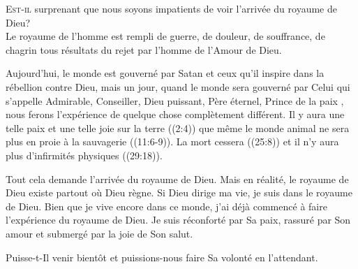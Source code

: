 

\lettrine{E}{st-il} surprenant que nous soyons impatients
 de voir l'arrivée du royaume de Dieu? \\[1ex]
Le royaume de l'homme est rempli de guerre, de douleur, de souffrance,
 de chagrin \ocadr tous résultats du rejet par l'homme de l'Amour de Dieu. 


Aujourd'hui, le monde est gouverné par Satan et ceux qu'il inspire
 dans la rébellion contre Dieu, mais un jour, quand le monde sera gouverné
 par Celui qui s'appelle \Og Admirable, Conseiller, Dieu puissant,
 Père éternel, Prince de la paix \Fg{}, 
 nous ferons l'expérience de quelque chose complètement différent.
 Il y aura une telle paix et une telle joie sur la terre ((2:4))
 que même le monde animal ne sera plus en proie à la sauvagerie
 ((11:6-9)).
 La mort cessera ((25:8))
 et il n'y aura plus d'infirmités physiques ((29:18)). 

Tout cela demande l'arrivée du royaume de Dieu.
 Mais en réalité, le royaume de Dieu existe partout où Dieu règne.
 Si Dieu dirige ma vie, je suis dans le royaume de Dieu.
 Bien que je vive encore dans ce monde, j'ai déjà commencé à faire
 l'expérience du royaume de Dieu. Je suis réconforté par Sa paix,
 rassuré par Son amour et submergé par la joie de Son salut. 

Puisse-t-Il venir bientôt
 \ocadr et puissions-nous faire Sa volonté en l'attendant. 

\dvrule



